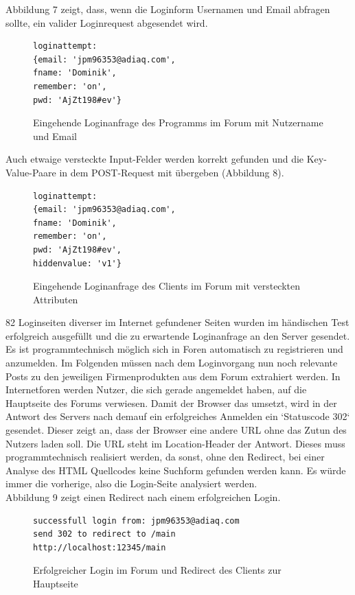 Abbildung 7 zeigt, dass, wenn die Loginform Usernamen und Email abfragen sollte, ein valider Loginrequest abgesendet wird.

\begin{figure}[h!]
\begin{lstlisting}[language=HTML5]
loginattempt:
{email: 'jpm96353@adiaq.com',
fname: 'Dominik',
remember: 'on',
pwd: 'AjZt198#ev'}
\end{lstlisting}
\caption{Eingehende Loginanfrage des Programms im Forum mit Nutzername und Email}
\end{figure}

Auch etwaige versteckte Input-Felder werden korrekt gefunden und die Key-Value-Paare in dem POST-Request mit übergeben (Abbildung 8).

\begin{figure}[h!]
\begin{lstlisting}[language=HTML5]
loginattempt:
{email: 'jpm96353@adiaq.com',
fname: 'Dominik',
remember: 'on',
pwd: 'AjZt198#ev',
hiddenvalue: 'v1'}
\end{lstlisting}
\caption{Eingehende Loginanfrage des Clients im Forum mit versteckten Attributen}
\end{figure}


82 Loginseiten diverser im Internet gefundener Seiten wurden im händischen Test erfolgreich ausgefüllt und die zu erwartende Loginanfrage an den Server gesendet.\\
Es ist programmtechnisch möglich sich in Foren automatisch zu registrieren und anzumelden. Im Folgenden müssen nach dem Loginvorgang nun noch relevante Posts zu den jeweiligen Firmenprodukten aus dem Forum extrahiert werden.\newline
In Internetforen werden Nutzer, die sich gerade angemeldet haben, auf die Hauptseite des Forums verwiesen. Damit der Browser das umsetzt, wird in der Antwort des Servers nach demauf ein erfolgreiches Anmelden ein `Statuscode 302` gesendet. Dieser zeigt an, dass der Browser eine andere URL ohne das Zutun des Nutzers laden soll. Die URL steht im Location-Header der Antwort. Dieses muss programmtechnisch realisiert werden, da sonst, ohne den Redirect, bei einer Analyse des HTML Quellcodes keine Suchform gefunden werden kann. Es würde immer die vorherige, also die Login-Seite analysiert werden.\\
Abbildung 9 zeigt einen Redirect nach einem erfolgreichen Login.

\begin{figure}[ht]
\begin{lstlisting}[language=HTML5]
successfull login from: jpm96353@adiaq.com
send 302 to redirect to /main
http://localhost:12345/main
\end{lstlisting}
\caption{Erfolgreicher Login im Forum und Redirect des Clients zur Hauptseite}
\end{figure}

